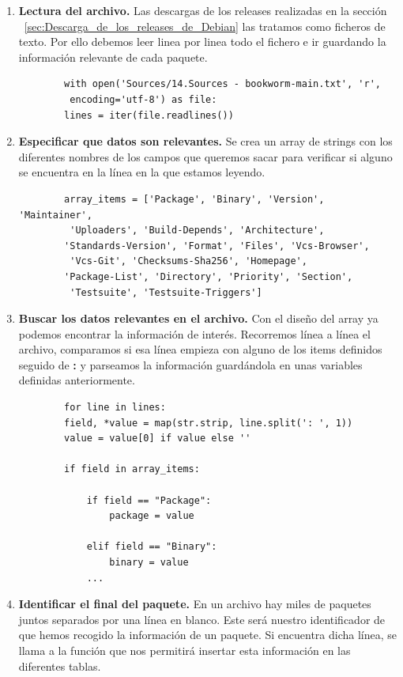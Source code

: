 \documentclass[a4paper, 12pt]{book}
\begin{document}
\begin{enumerate}
	\item \textbf{Lectura del archivo.} Las descargas de los releases realizadas en la sección  ~\ref{sec:Descarga_de_los_releases_de_Debian} las tratamos como ficheros de texto. Por ello debemos leer linea por linea todo el fichero e ir guardando la información relevante de cada paquete.
	
	\begin{verbatim}
		with open('Sources/14.Sources - bookworm-main.txt', 'r',
		 encoding='utf-8') as file:
		lines = iter(file.readlines())
	\end{verbatim}
	
	\item \textbf{Especificar que datos son relevantes.} Se crea un array de strings con los diferentes nombres de los campos que queremos sacar para verificar si alguno se encuentra en la línea en la que estamos leyendo.
	
	\begin{verbatim}
		array_items = ['Package', 'Binary', 'Version', 'Maintainer',
		 'Uploaders', 'Build-Depends', 'Architecture',
		'Standards-Version', 'Format', 'Files', 'Vcs-Browser',
		 'Vcs-Git', 'Checksums-Sha256', 'Homepage',
		'Package-List', 'Directory', 'Priority', 'Section',
		 'Testsuite', 'Testsuite-Triggers']
	\end{verbatim}
	
	\item \textbf{Buscar los datos relevantes en el archivo.} Con el diseño del array ya podemos encontrar la información de interés. Recorremos línea a línea el archivo, comparamos si esa línea empieza con alguno de los items definidos seguido de \textbf{:} y parseamos la información guardándola en unas variables definidas anteriormente.
	
	\begin{verbatim}
		for line in lines:
		field, *value = map(str.strip, line.split(': ', 1))
		value = value[0] if value else ''
		
		if field in array_items:
	
			if field == "Package":
				package = value
			
			elif field == "Binary":
				binary = value
			...
	\end{verbatim}
	
		\item \textbf{Identificar el final del paquete.} En un archivo hay miles de paquetes juntos separados por una línea en blanco. Este será nuestro identificador de que hemos recogido la información de un paquete. Si encuentra dicha línea, se llama a la función que nos permitirá insertar esta información en las diferentes tablas.
		

\end{enumerate}
\end{document}
